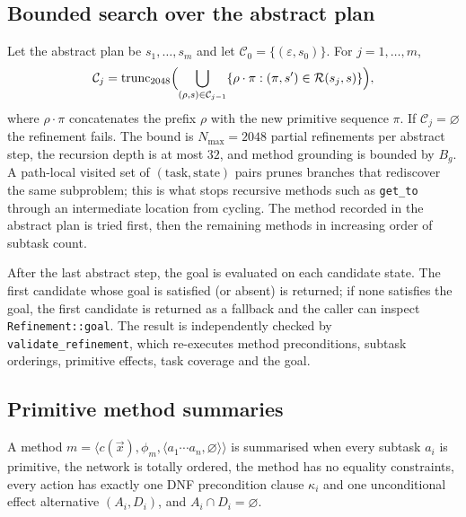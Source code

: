 \documentclass[11pt,a4paper]{article}
\newcommand{\cC}{\mathcal{C}}
\newcommand{\cR}{\mathcal{R}}
\begin{document}
\subsection{Bounded search over the abstract plan}
Let the abstract plan be $s_1,\dots,s_m$ and let
$\cC_0=\{(\varepsilon,s_0)\}$. For $j=1,\dots,m$,
\begin{equation}
\cC_j=\operatorname{trunc}_{2048}
\Bigl(\bigcup_{(\rho,s)\in\cC_{j-1}}
\{\rho\cdot\pi:(\pi,s')\in\cR(s_j,s)\}\Bigr),
\end{equation}
where $\rho\cdot\pi$ concatenates the prefix $\rho$ with the new primitive
sequence $\pi$. If
$\cC_j=\varnothing$ the refinement fails. The bound is
$N_{\max}=2048$ partial refinements per abstract step, the recursion depth is
at most $32$, and method grounding is bounded by $B_g$. A path-local visited
set of $(\text{task},\text{state})$ pairs prunes branches that rediscover the
same subproblem; this is what stops recursive methods such as
\texttt{get\_to} through an intermediate location from cycling. The method
recorded in the abstract plan is tried first, then the remaining methods in
increasing order of subtask count.

After the last abstract step, the goal is evaluated on each candidate state.
The first candidate whose goal is satisfied (or absent) is returned; if none
satisfies the goal, the first candidate is returned as a fallback and the
caller can inspect \texttt{Refinement::goal}. The result is independently
checked by \texttt{validate\_refinement}, which re-executes method
preconditions, subtask orderings, primitive effects, task coverage and the
goal.

\subsection{Primitive method summaries}
A method
$m=\langle c(\vec{x}),\phi_m,\langle a_1\cdots a_n,\varnothing\rangle\rangle$
is summarised when every subtask $a_i$ is primitive, the network is totally
ordered, the method has no equality constraints, every action has exactly one
DNF precondition clause $\kappa_i$ and one unconditional effect alternative
$(A_i,D_i)$, and $A_i\cap D_i=\varnothing$.
\end{document}
